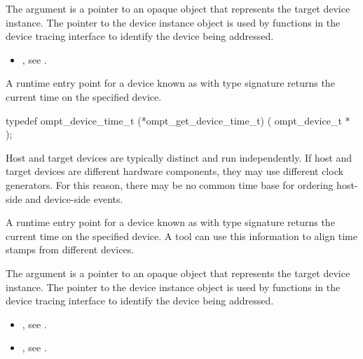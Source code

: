 \argdesc

The argument  is a pointer to an opaque object that
represents the target device instance. The pointer to the device
instance object is used by functions in the device tracing interface
to identify the device being addressed.

\crossreferences
\begin{itemize}
\item {},
see .
\end{itemize}

\label{sec:ompt_get_device_time_t}

\summary
A runtime entry point for a device known
as 
with type signature 
returns the current time on the specified device.

\format
\begin{ccppspecific}
\begin{omptInquiry}
typedef ompt_device_time_t (*ompt_get_device_time_t) (
  ompt_device_t *
);
\end{omptInquiry}
\end{ccppspecific}

\descr
Host and target devices are typically distinct and run independently.
If host and target devices are different hardware components, they
may use different clock generators. For this reason,  there may be
no common time base for ordering host-side and device-side events.

A runtime entry point for a device known
as  with type signature
returns the current time on the specified device.
A tool can use this information
to align time stamps from different devices.

\argdesc

The argument  is a pointer to an opaque object that
represents the target device instance. The pointer to the device
instance object is used by functions in the device tracing interface
to identify the device being addressed.

\crossreferences
\begin{itemize}
\item {},
see .
\item {},
see .
\end{itemize}

